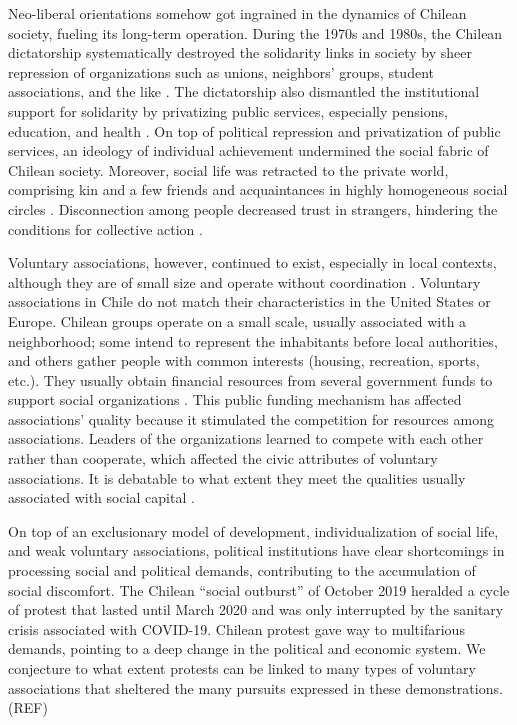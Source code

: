 Neo-liberal orientations somehow got ingrained in the dynamics of Chilean society, fueling its long-term operation. During the 1970s and 1980s, the Chilean dictatorship systematically destroyed the solidarity links in society by sheer repression of organizations such as unions, neighbors' groups, student associations, and the like \parencite{espinoza_local_2013}. The dictatorship also dismantled the institutional support for solidarity by privatizing public services, especially pensions, education, and health \parencite{espinoza_contention_2018}. On top of political repression and privatization of public services, an ideology of individual achievement undermined the social fabric of Chilean society. Moreover, social life was retracted to the private world, comprising kin and a few friends and acquaintances in highly homogeneous social circles \parencite{espinoza_citizens_2009}. Disconnection among people decreased trust in strangers, hindering the conditions for collective action \parencite{lechner_desafios_2000}.
\bigskip

Voluntary associations, however, continued to exist, especially in local contexts, although they are of small size and operate without coordination \parencite{espinoza_local_2013}. Voluntary associations in Chile do not match their characteristics in the United States or Europe. Chilean groups operate on a small scale, usually associated with a neighborhood; some intend to represent the inhabitants before local authorities, and others gather people with common interests (housing, recreation, sports, etc.). They usually obtain financial resources from several government funds to support social organizations \parencite{alenda__2013}. This public funding mechanism has affected associations' quality because it stimulated the competition for resources among associations. Leaders of the organizations learned to compete with each other rather than cooperate, which affected the civic attributes of voluntary associations. It is debatable to what extent they meet the qualities usually associated with social capital \parencite{delamaza_sociedad_2002, espinoza_local_2013}.
\bigskip

On top of an exclusionary model of development, individualization of social life, and weak voluntary associations, political institutions have clear shortcomings in processing social and political demands, contributing to the accumulation of social discomfort. The Chilean “social outburst” of October 2019 heralded a cycle of protest that lasted until March 2020 and was only interrupted by the sanitary crisis associated with COVID-19. Chilean protest gave way to multifarious demands, pointing to a deep change in the political and economic system. We conjecture to what extent protests can be linked to many types of voluntary associations that sheltered the many pursuits expressed in these demonstrations. (REF)
\bigskip

